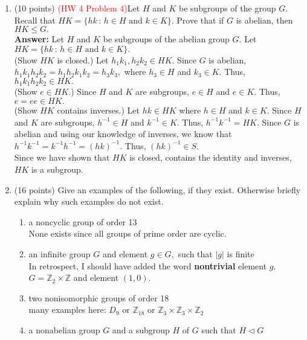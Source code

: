 \documentclass[12pt]{article}
\renewcommand{\emph}[1]{\textsf{\textbf{#1}}}
\newcommand{\bbZ}{\mathbb{Z}}
\begin{document}
\begin{enumerate}
\item (10 points) \textcolor{red}{(HW 4 Problem 4)}Let $H$ and $K$ be subgroups of the group $G.$ Recall that $HK=\{hk \, : \, h \in H \text{ and } k \in K \}.$ Prove that {if $G$ is abelian}, then $HK \leq G.$\\
\vfill
\textbf{Answer:} Let $H$ and $K$ be subgroups of the abelian group $G.$ Let $HK=\{hk \, : \, h \in H \text{ and } k \in K \}.$\\
(Show $HK$ is closed.) Let $h_1k_1,h_2k_2 \in HK.$ Since $G$ is abelian, $h_1k_1h_2k_2=h_1h_2k_1k_2=h_3k_3,$ where $h_3 \in H$ and $k_3 \in K.$ Thus, $h_1k_1h_2k_2 \in HK.$\\
(Show $e \in HK.$) Since $H$ and $K$ are subgroups, $e \in H$ and $e \in K.$ Thus, $e=ee \in HK.$\\
(Show $HK$ contains inverses.) Let $hk \in HK$ where $h\in H$ and $k \in K.$ Since $H$ and $K$ are subgroups, $h^{-1} \in H$ and $k^{-1} \in K.$ Thus, $h^{-1}k^{-1}=HK.$ Since $G$ is abelian and using our knowledge of inverses, we know that $h^{-1}k^{-1}=k^{-1}h^{-1}=(hk)^{-1}.$ Thus, $(hk)^{-1} \in S.$\\
Since we have shown that $HK$ is closed, contains the identity and inverses, $HK$ is a subgroup.\\


\item (16 points) Give an examples of the following, if they exist. Otherwise briefly explain why such examples do not exist.
	\begin{enumerate}
	\item a noncyclic group of order 13\\
	
	None exists since all groups of prime order are cyclic.\\
	\vfill
	\item an infinite group $G$ and element $g \in G,$ such that $|g|$ is finite\\ 
	In retrospect, I should have added the word \emph{nontrivial} element $g.$\\
	
	$G=\bbZ_2 \times \bbZ$ and element $(1,0).$\\
	\vfill
	\item two nonisomorphic groups of order 18\\
	
	many examples here: $D_9$ or $\bbZ_{18}$ or $\bbZ_3 \times \bbZ_3 \times \bbZ_2$
	\vfill
	\item a nonabelian group $G$ and a subgroup $H$ of $G$ such that $H \lhd G$\\
	

\end{enumerate}
\end{enumerate}
\end{document}
